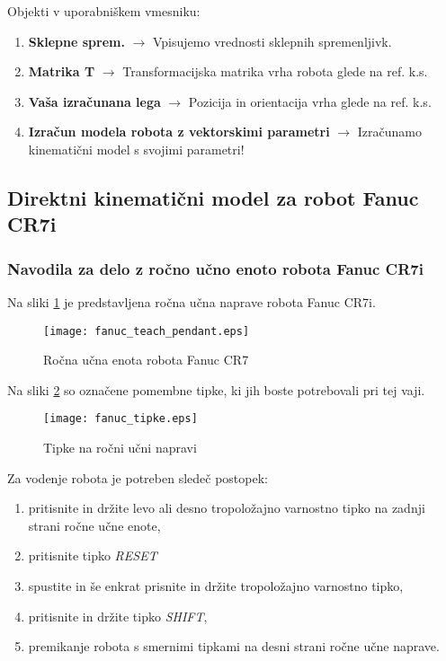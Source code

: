 Objekti v uporabniškem vmesniku:

\begin{enumerate}
    \vspace{-0.2cm}%
    \item[] \textbf{Sklepne sprem.} $\longrightarrow$ Vpisujemo vrednosti sklepnih spremenljivk. %
    \vspace{-0.2cm}%
    \item[] \textbf{Matrika T} $\longrightarrow$ Transformacijska matrika vrha robota glede na ref. k.s. %
    \vspace{-0.2cm}%
    \item[] \textbf{Vaša izračunana lega} $\longrightarrow$ Pozicija in orientacija vrha glede na ref. k.s. %
    \vspace{-0.2cm}%
    \item[] \textbf{Izračun modela robota z vektorskimi parametri} $\longrightarrow$ Izračunamo kinematični model s svojimi parametri! %
\end{enumerate}



\subsection{Direktni kinematični model za robot Fanuc CR7i}

\subsubsection{Navodila za delo z ročno učno enoto robota Fanuc CR7i}

Na sliki \ref{delovno_okolje_CR7} je predstavljena ročna učna naprave robota Fanuc CR7i.
\begin{figure}[h]
\centering
\texttt{[image: fanuc\_teach\_pendant.eps]}
  \caption{\label{delovno_okolje_CR7} Ročna učna enota robota Fanuc CR7}
\end{figure}

Na sliki \ref{CR7_tipke} so označene pomembne tipke, ki jih boste potrebovali pri tej vaji.
\begin{figure}[h]
\centering
\texttt{[image: fanuc\_tipke.eps]}
  \caption{\label{CR7_tipke} Tipke na ročni učni napravi}
\end{figure}

Za vodenje robota je potreben sledeč postopek:
\begin{enumerate}
	\item pritisnite in držite levo ali desno tropoložajno varnostno tipko na zadnji strani ročne učne enote,
	\item pritisnite tipko \emph{RESET}
	\item spustite in še enkrat prisnite in držite tropoložajno varnostno tipko,
	\item pritisnite in držite tipko \emph{SHIFT},
	\item premikanje robota s smernimi tipkami na desni strani ročne učne naprave.
\end{enumerate}

